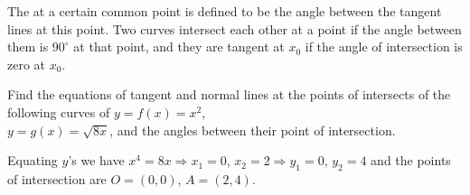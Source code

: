 \documentclass[11pt]{amsbook}
\begin{document}

The  
at a certain common point is defined to be the angle between the tangent lines at this point.
Two curves intersect each other 
at a point if the angle between them is $90^{\circ}$ at that point, 
and they are tangent at $x_0$ if the angle of intersection is zero at $x_0$.\\


\begin{exmp}

	Find the equations of tangent and normal lines at the points of intersects of the following curves of
	$y = f(x) = x^2$,\\
	$y = g(x) = \sqrt{8x}$, 
	and the angles between their point of intersection.

	\begin{hSolution}
		Equating $y$'s we have $x^4 = 8x 
		\Rightarrow x_1 = 0$, $x_2 = 2 
		\Rightarrow y_1 = 0$, $y_2 = 4$ 
		and the points of intersection are $O = (0,0)$, $A = (2,4)$.
	\end{hSolution}

\end{exmp}
\end{document}
